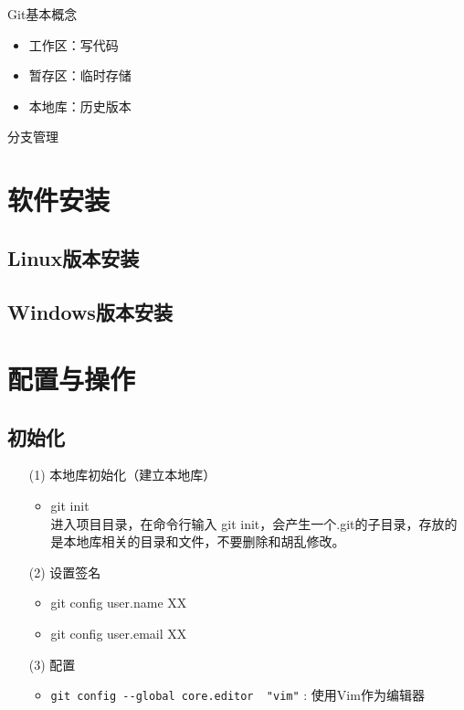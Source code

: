 Git基本概念
\begin{itemize}
\item 工作区：写代码
\item 暂存区：临时存储
\item 本地库：历史版本
\end{itemize}

分支管理





\section{软件安装}
\subsection{Linux版本安装}
\subsection{Windows版本安装}


\section{配置与操作}
\subsection{初始化}
\begin{itemize}
\item[(1)] 本地库初始化（建立本地库）
\begin{itemize}
\item git init\\
进入项目目录，在命令行输入 git init，会产生一个.git的子目录，存放的是本地库相关的目录和文件，不要删除和胡乱修改。
\end{itemize}

\item[(2)] 设置签名
\begin{itemize}
\item git config user.name XX
\item git config user.email XX
\end{itemize}

\item [(3)] 配置
\begin{itemize}
\item \verb|git config --global core.editor  "vim"| : 使用Vim作为编辑器
\end{itemize}

\end{itemize}




